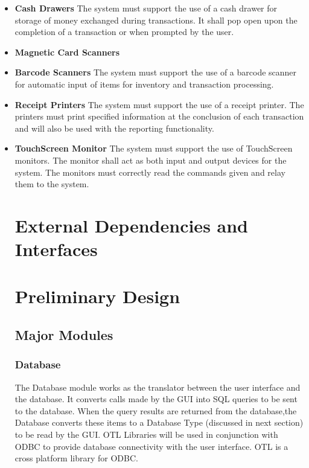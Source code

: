 \documentclass{report}
\begin{document}
        \begin{itemize}
	    \item {\bf Cash Drawers} The system must support the use of a
	    cash drawer for storage of money exchanged during transactions.
	    It shall pop open upon the completion of a transaction or when 
	    prompted by the user.

	    \item {\bf Magnetic Card Scanners} 

	    \item {\bf Barcode Scanners} The system must support the use of
	    a barcode scanner for automatic input of items for inventory
	    and transaction processing.

	    \item {\bf Receipt Printers} The system must support the use of
            a receipt printer.  The printers must print specified information
            at the conclusion of each transaction and will also be used with
	    the reporting functionality.

            \item {\bf TouchScreen Monitor} The system must support the use
            of TouchScreen monitors.  The monitor shall act as both input and
	    output devices for the system.  The monitors must correctly read 
            the commands given and relay them to the system.

\section{External Dependencies and Interfaces}

\section{Preliminary Design}

    \subsection{Major Modules}

        \subsubsection{Database}
        The Database module works as the translator between
        the user interface and the database.  It converts calls
        made by the GUI into SQL queries to be sent to the
        database.  When the query results are returned from the
        database,the Database converts these items to a
        Database Type (discussed in next section) to be read by the
        GUI. OTL Libraries will be used in conjunction with ODBC to
    provide database connectivity with the user interface. OTL is
    a cross platform library for ODBC.

\end{itemize}
\end{document}
